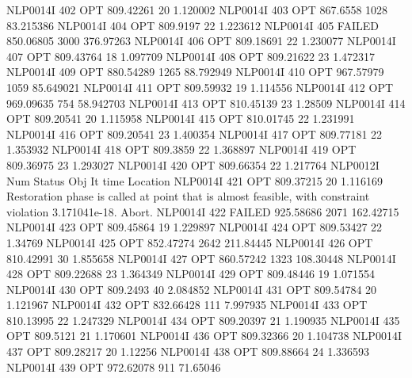 NLP0014I           402         OPT 809.42261       20 1.120002
NLP0014I           403         OPT 867.6558     1028 83.215386
NLP0014I           404         OPT 809.9197       22 1.223612
NLP0014I           405      FAILED 850.06805     3000 376.97263
NLP0014I           406         OPT 809.18691       22 1.230077
NLP0014I           407         OPT 809.43764       18 1.097709
NLP0014I           408         OPT 809.21622       23 1.472317
NLP0014I           409         OPT 880.54289     1265 88.792949
NLP0014I           410         OPT 967.57979     1059 85.649021
NLP0014I           411         OPT 809.59932       19 1.114556
NLP0014I           412         OPT 969.09635      754 58.942703
NLP0014I           413         OPT 810.45139       23 1.28509
NLP0014I           414         OPT 809.20541       20 1.115958
NLP0014I           415         OPT 810.01745       22 1.231991
NLP0014I           416         OPT 809.20541       23 1.400354
NLP0014I           417         OPT 809.77181       22 1.353932
NLP0014I           418         OPT 809.3859       22 1.368897
NLP0014I           419         OPT 809.36975       23 1.293027
NLP0014I           420         OPT 809.66354       22 1.217764
NLP0012I 
              Num      Status      Obj             It       time                 Location
NLP0014I           421         OPT 809.37215       20 1.116169
Restoration phase is called at point that is almost feasible,
  with constraint violation 3.171041e-18. Abort.
NLP0014I           422      FAILED 925.58686     2071 162.42715
NLP0014I           423         OPT 809.45864       19 1.229897
NLP0014I           424         OPT 809.53427       22 1.34769
NLP0014I           425         OPT 852.47274     2642 211.84445
NLP0014I           426         OPT 810.42991       30 1.855658
NLP0014I           427         OPT 860.57242     1323 108.30448
NLP0014I           428         OPT 809.22688       23 1.364349
NLP0014I           429         OPT 809.48446       19 1.071554
NLP0014I           430         OPT 809.2493       40 2.084852
NLP0014I           431         OPT 809.54784       20 1.121967
NLP0014I           432         OPT 832.66428      111 7.997935
NLP0014I           433         OPT 810.13995       22 1.247329
NLP0014I           434         OPT 809.20397       21 1.190935
NLP0014I           435         OPT 809.5121       21 1.170601
NLP0014I           436         OPT 809.32366       20 1.104738
NLP0014I           437         OPT 809.28217       20 1.12256
NLP0014I           438         OPT 809.88664       24 1.336593
NLP0014I           439         OPT 972.62078      911 71.65046
